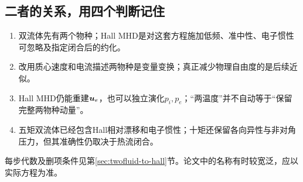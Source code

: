 \subsection{二者的关系，用四个判断记住}
\begin{enumerate}
\item 双流体先有两个物种；Hall MHD是对这套方程施加低频、准中性、电子惯性可忽略及指定闭合后的约化。
\item 改用质心速度和电流描述两物种是变量变换；真正减少物理自由度的是后续近似。
\item Hall MHD仍能重建$\bm{u}_e$，也可以独立演化$p_i,p_e$；“两温度”并不自动等于“保留完整两物种动量”。
\item 五矩双流体已经包含Hall相对漂移和电子惯性；十矩还保留各向异性与非对角压力，但其准确性仍取决于热流闭合。
\end{enumerate}
每步代数及删项条件见第\ref{sec:twofluid-to-hall}节。论文中的名称有时较宽泛，应以实际方程为准。

